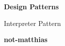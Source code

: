 \begin{titlepage}
    \begin{center}
        \vspace*{5cm}
            
        \Huge
        \textbf{Design Patterns}
            
        \vspace{0.5cm}
        \LARGE
        Interpreter Pattern
            
        \vspace{1.5cm}
            
        \textbf{not-matthias}
            
        \vfill
            
    \end{center}
\end{titlepage}